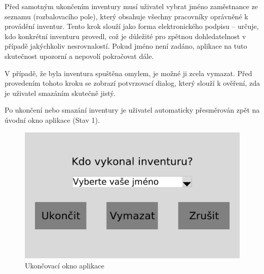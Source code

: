 Před samotným ukončením inventury musí uživatel vybrat jméno zaměstnance ze seznamu (rozbalovacího pole), který obsahuje všechny pracovníky oprávněné k provádění inventur. Tento krok slouží jako forma elektronického podpisu – určuje, kdo konkrétní inventuru provedl, což je důležité pro zpětnou dohledatelnost v případě jakýchkoliv nesrovnalostí. Pokud jméno není zadáno, aplikace na tuto skutečnost upozorní a nepovolí pokračovat dále.

V případě, že byla inventura spuštěna omylem, je možné ji zcela vymazat. Před provedením tohoto kroku se zobrazí potvrzovací dialog, který slouží k ověření, zda je uživatel smazáním skutečně jistý.

Po ukončení nebo smazání inventury je uživatel automaticky přesměrován zpět na úvodní okno aplikace (Stav 1).


\begin{figure}[H]
    \begin{center}
        \includegraphics[scale=0.4]{obrazky/GUI Konec inventury.png}
    \end{center}
    \caption{Ukončovací okno aplikace}
    \label{Ukončovací okno aplikace}
\end{figure}


